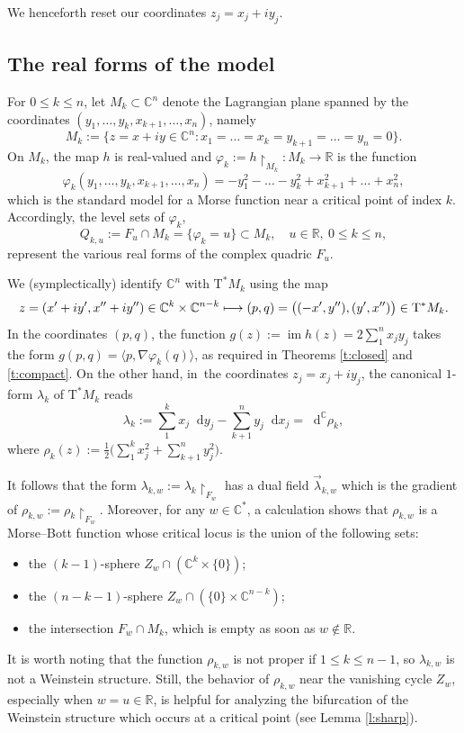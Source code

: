 \documentclass[JEP,XML,SOM,Unicode]{cedram}
\newcommand\mto{\mathchoice{\longmapsto}{\mapsto}{\mapsto}{\mapsto}}
\newcommand{\C}{{\mathbb C}}
\newcommand{\R}{{\mathbb R}}
\newcommand{\im}{\operatorname{im}}
\newcommand{\etc}{,\ldots,}
\newcommand{\sT}{\mathrm{T}^\ast}
\renewcommand{\d}{\mathop{}\!\mathrm d}
\newcommand{\dc}{\d^{\scriptscriptstyle{\C}}}
\newcommand{\dx}{\d x}
\newcommand{\dy}{\d y}
\newcommand{\prg}[1]{\langle #1 \rangle}
\newcommand{\de}{\mathrel{:=}}
\newcommand{\rst}[1]{{\upharpoonright}_{\!#1}}
\newcommand{\with}{\mathrel{:}}
\let\on\colon
\theoremstyle{plain}
\theoremstyle{definition}
\begin{document}
We henceforth reset our coordinates $z_j = x_j+iy_j$.

\smallskip

\subsection{The real forms of the model} \label{ss:locmod2}

For $0 \le k \le n$, let $M_k \subset \C^n$ denote the Lagrangian plane spanned
by the coordinates $(y_1 \etc y_k, x_{k+1} \etc x_n)$, namely
\[
M_k \de \{z = x+iy \in \C^n \with
 x_1 =\dots= x_k = y_{k+1} =\dots= y_n = 0\}.
\]
On $M_k$, the map $h$ is real-valued and $\varphi_k \de h \rst{ M_k } \on M_k
\to \R$ is the function
\[
\varphi_k (y_1 \etc y_k, x_{k+1} \etc x_n)
 = - y_1^2 -\dots- y_k^2 + x_{k+1}^2 +\dots+ x_n^2,
\]
which is the standard model for a Morse function near a critical point of index
$k$. Accordingly, the level sets of $\varphi_k$,
\[
Q_{k,u} \de F_u \cap M_k = \{\varphi_k=u\} \subset M_k, \quad
 u \in \R, \ 0 \le k \le n,
\]
represent the various real forms of the complex quadric $F_u$.

We (symplectically) identify $\C^n$ with $\sT M_k$ using the map
\[
z = (x'+iy', x''+iy'') \in \C^k \times \C^{n-k}
 \mto (p,q) = \bigl((-x',y''), (y',x'')\bigr) \in \sT M_k.
\]
In the coordinates $(p,q)$, the function $g(z) \de \im h(z) = 2 \sum_1^n x_jy_j$
takes the form $g(p,q) = \prg{p, \nabla\varphi_k(q)}$, as required in Theorems
\ref{t:closed} and \ref{t:compact}. On the other hand, in~the coordinates $z_j
= x_j+iy_j$, the canonical $1$-form $\lambda_k$ of $\sT M_k$ reads
\[
\lambda_k \de \sum_1^k x_j \dy_j - \sum_{k+1}^n y_j \dx_j = \dc\rho_k,
\]
where $\rho_k(z) \de \tfrac12 \bigl(\sum_1^k x_j^2 + \sum_{k+1}^n y_j^2\bigr)$.

It follows that the form $\lambda_{k,w} \de \lambda_k \rst{ F_w }$ has a dual
field $\vec\lambda_{k,w}$ which is the gradient of $\rho_{k,w} \de \rho_k \rst{
F_w }$. Moreover, for any $w \in \C^*$, a calculation shows that $\rho_{k,w}$ is
a Morse--Bott function whose critical locus is the union of the following sets:
\begin{itemize}
\item
the $(k-1)$-sphere $Z_w \cap (\C^k \times \{0\})$;
\item
the $(n-k-1)$-sphere $Z_w \cap (\{0\} \times \C^{n-k})$;
\item
the intersection $F_w \cap M_k$, which is empty as soon as $w \notin \R$.
\end{itemize}
It is worth noting that the function $\rho_{k,w}$ is not proper if $1 \le k \le
n-1$, so $\lambda_{k,w}$ is not a Weinstein structure. Still, the behavior of
$\rho_{k,w}$ near the vanishing cycle $Z_w$, especially when $w=u \in \R$, is
helpful for analyzing the bifurcation of the Weinstein structure which occurs at
a critical point (see Lemma \ref{l:sharp}).
\end{document}
